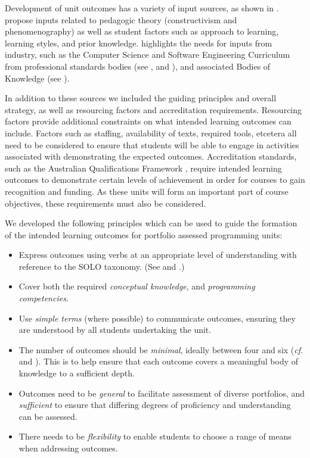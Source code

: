 Development of unit outcomes has a variety of input sources, as shown in . \citet{Thota:2010} propose inputs related to pedagogic theory (constructivism and phenomenography) as well as student factors such as approach to learning, learning styles, and prior knowledge. \citet{Armarego:2009} highlights the needs for inputs from industry, such as the Computer Science and Software Engineering Curriculum from professional standards bodies (see \citet{Lethbridge:2006}, \citet{Cassel:2008} and \citet{CSC2013}), and associated Bodies of Knowledge (see \citet{Abran:2001}). 

In addition to these sources we included the guiding principles and overall strategy, as well as resourcing factors and accreditation requirements. Resourcing factors provide additional constraints on what intended learning outcomes can include. Factors such as staffing, availability of texts, required tools, etcetera all need to be considered to ensure that students will be able to engage in activities associated with demonstrating the expected outcomes. Accreditation standards, such as the Australian Qualifications Framework \cite{AQF:2013}, require intended learning outcomes to demonstrate certain levels of achievement in order for courses to gain recognition and funding. As these units will form an important part of course objectives, these requirements must also be considered. 

We developed the following principles which can be used to guide the formation of the intended learning outcomes for portfolio assessed programming units:
\begin{itemize}[noitemsep,nolistsep]
  \item Express outcomes using verbs at an appropriate level of understanding with reference to the SOLO taxonomy. (See \citet{Biggs:2007} and \citet{Biggs:1982}.)
  \item Cover both the required \emph{conceptual knowledge}, and \emph{programming competencies}.
  \item Use \emph{simple terms} (where possible) to communicate outcomes, ensuring they are understood by all students undertaking the unit.
  \item The number of outcomes should be \emph{minimal}, ideally between four and six (\emph{cf.} \citet{Biggs:2007} and \citet{Gardner:1994}). This is to help ensure that each outcome covers a meaningful body of knowledge to a sufficient depth.
  \item Outcomes need to be \emph{general} to facilitate assessment of diverse portfolios, and \emph{sufficient} to ensure that differing degrees of proficiency and understanding can be assessed.
  \item There needs to be \emph{flexibility} to enable students to choose a range of means when addressing outcomes.
\end{itemize}

